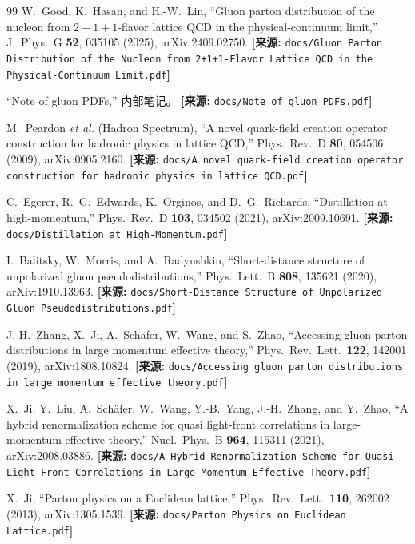 \documentclass[12pt,a4paper]{ctexart}
\theoremstyle{definition}
\begin{document}
\begin{thebibliography}{99}
W.~Good, K.~Hasan, and H.-W.~Lin,
``Gluon parton distribution of the nucleon from $2+1+1$-flavor lattice QCD in the physical-continuum limit,''
J.\ Phys.\ G \textbf{52}, 035105 (2025), arXiv:2409.02750.
\quad\textbf{[来源:} \texttt{docs/Gluon Parton Distribution of the Nucleon from 2+1+1-Flavor Lattice QCD in the Physical-Continuum Limit.pdf}\textbf{]}


``Note of gluon PDFs,''
内部笔记。
\quad\textbf{[来源:} \texttt{docs/Note of gluon PDFs.pdf}\textbf{]}

M.~Peardon \textit{et al.} (Hadron Spectrum),
``A novel quark-field creation operator construction for hadronic physics in lattice QCD,''
Phys.\ Rev.\ D \textbf{80}, 054506 (2009), arXiv:0905.2160.
\quad\textbf{[来源:} \texttt{docs/A novel quark-field creation operator construction for hadronic physics in lattice QCD.pdf}\textbf{]}

C.~Egerer, R.~G.~Edwards, K.~Orginos, and D.~G.~Richards,
``Distillation at high-momentum,''
Phys.\ Rev.\ D \textbf{103}, 034502 (2021), arXiv:2009.10691.
\quad\textbf{[来源:} \texttt{docs/Distillation at High-Momentum.pdf}\textbf{]}

I.~Balitsky, W.~Morris, and A.~Radyushkin,
``Short-distance structure of unpolarized gluon pseudodistributions,''
Phys.\ Lett.\ B \textbf{808}, 135621 (2020), arXiv:1910.13963.
\quad\textbf{[来源:} \texttt{docs/Short-Distance Structure of Unpolarized Gluon Pseudodistributions.pdf}\textbf{]}

J.-H.~Zhang, X.~Ji, A.~Sch\"afer, W.~Wang, and S.~Zhao,
``Accessing gluon parton distributions in large momentum effective theory,''
Phys.\ Rev.\ Lett.\ \textbf{122}, 142001 (2019), arXiv:1808.10824.
\quad\textbf{[来源:} \texttt{docs/Accessing gluon parton distributions in large momentum effective theory.pdf}\textbf{]}

X.~Ji, Y.~Liu, A.~Sch\"afer, W.~Wang, Y.-B.~Yang, J.-H.~Zhang, and Y.~Zhao,
``A hybrid renormalization scheme for quasi light-front correlations in large-momentum effective theory,''
Nucl.\ Phys.\ B \textbf{964}, 115311 (2021), arXiv:2008.03886.
\quad\textbf{[来源:} \texttt{docs/A Hybrid Renormalization Scheme for Quasi Light-Front Correlations in Large-Momentum Effective Theory.pdf}\textbf{]}

X.~Ji,
``Parton physics on a Euclidean lattice,''
Phys.\ Rev.\ Lett.\ \textbf{110}, 262002 (2013), arXiv:1305.1539.
\quad\textbf{[来源:} \texttt{docs/Parton Physics on Euclidean Lattice.pdf}\textbf{]}


\end{thebibliography}
\end{document}

